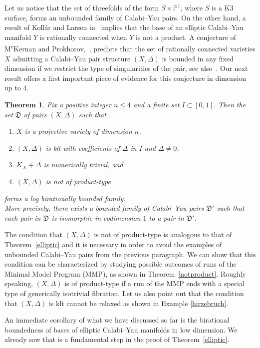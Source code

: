 \documentclass{amsart}[12pt,a4paper]
\newtheorem{theorem}{Theorem}[section]
\theoremstyle{definition}
\newcommand{\pp}{\mathbb{P}}
\begin{document}
Let us notice that the set of threefolds of the form $S\times \pp^1$, where $S$ is a K3 surface, forms an unbounded family of Calabi--Yau pairs. 
On the other hand, a result of Koll\'ar and Larsen in~\cite{KL} implies that the base of an elliptic Calabi--Yau manifold $Y$ is rationally connected when $Y$ is not a product.
A conjecture of M\textsuperscript{c}Kernan and Prokhorov,~\cite[Conjecture~3.9]{MP}, predicts that the set of rationally connected varieties $X$ admitting a Calabi--Yau pair structure $(X, \Delta)$ is bounded in any fixed dimension if we restrict the type of singularities of the pair, see also~\cite[Conjecture~1.3]{rccy3}.
Our next result offers a first important piece of evidence for this conjecture in dimension up to $4$.

\begin{theorem}
\label{main}
Fix a positive integer $n\leq 4$ and a finite set $I \subset [0,1]$. Then the set $\mathfrak{D}$ of pairs $(X,\Delta)$ such that 
	\begin{enumerate}
		\item $X$ is a projective variety of dimension $n$,
		\item $(X,\Delta)$ is klt with coefficients of $\Delta$ in $I$ and $\Delta \neq 0$,
		\item $K_X+\Delta$ is numerically trivial, and
		\item $(X,\Delta)$ is not of product-type 
	\end{enumerate}
	forms a log birationally bounded family.
\\
More precisely, there exists a bounded family of Calabi--Yau pairs $\mathfrak{D}'$ such that each pair in $\mathfrak{D}$ is isomorphic in codimension $1$ to a pair in $\mathfrak{D}'$.
\end{theorem}

The condition that $(X,\Delta)$ is not of product-type is analogous to that of Theorem~\ref{elliptic} and it is necessary in order to avoid the examples of unbounded Calabi--Yau pairs from the previous paragraph.
We can show that this condition can be characterized by studying possible outcomes of runs of the Minimal Model Program (MMP), as shown in Theorem~\ref{notproduct}. 
Roughly speaking, $(X,\Delta)$ is of product-type if a run of the MMP ends with a special type of generically isotrivial fibration.
Let us also point out that the condition that $(X,\Delta)$ is klt cannot be relaxed as shown in Example \ref{hirzebruch}.   

An immediate corollary of what we have discussed so far is the birational boundedness of bases of elliptic Calabi--Yau manifolds in low dimension. 
We already saw that is a fundamental step in the proof of Theorem~\ref{elliptic}.
\end{document}
